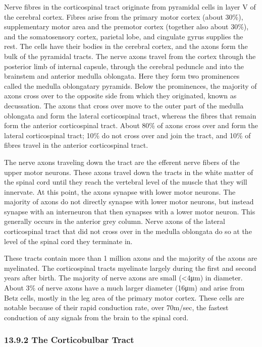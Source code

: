 Nerve fibres in the corticospinal tract originate from pyramidal cells
in layer V of the cerebral cortex. Fibres arise from the primary motor
cortex (about 30\%), supplementary motor area and the premotor cortex
(together also about 30\%), and the somatosensory cortex, parietal lobe,
and cingulate gyrus supplies the rest. The cells have their bodies in
the cerebral cortex, and the axons form the bulk of the pyramidal
tracts. The nerve axons travel from the cortex through the posterior
limb of internal capsule, through the cerebral peduncle and into the
brainstem and anterior medulla oblongata. Here they form two prominences
called the medulla oblongatary pyramids. Below the prominences, the
majority of axons cross over to the opposite side from which they
originated, known as decussation. The axons that cross over move to the
outer part of the medulla oblongata and form the lateral corticospinal
tract, whereas the fibres that remain form the anterior corticospinal
tract. About 80\% of axons cross over and form the lateral corticospinal
tract; 10\% do not cross over and join the tract, and 10\% of fibres
travel in the anterior corticospinal tract.

The nerve axons traveling down the tract are the efferent nerve fibers
of the upper motor neurons. These axons travel down the tracts in the
white matter of the spinal cord until they reach the vertebral level of
the muscle that they will innervate. At this point, the axons synapse
with lower motor neurons. The majority of axons do not directly synapse
with lower motor neurons, but instead synapse with an interneuron that
then synapses with a lower motor neuron. This generally occurs in the
anterior grey column. Nerve axons of the lateral corticospinal tract
that did not cross over in the medulla oblongata do so at the level of
the spinal cord they terminate in.

These tracts contain more than 1 million axons and the majority of the
axons are myelinated. The corticospinal tracts myelinate largely during
the first and second years after birth. The majority of nerve axons are
small (\textless4μm) in diameter. About 3\% of nerve axons have a much
larger diameter (16μm) and arise from Betz cells, mostly in the leg area
of the primary motor cortex. These cells are notable because of their
rapid conduction rate, over 70m/sec, the fastest conduction of any
signals from the brain to the spinal cord.

\hypertarget{the-corticobulbar-tract-1}{}
\hypertarget{the-corticobulbar-tract}{%
\subsubsection{\texorpdfstring{{13.9.2} The Corticobulbar
Tract}{13.9.2 The Corticobulbar Tract}}\label{the-corticobulbar-tract}}

